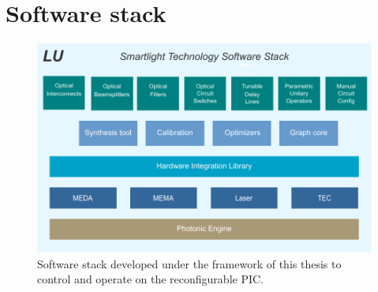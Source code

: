 
\section{Software stack}\label{sec:software_stack}

\begin{figure}[h]
	\begin{center}
		\includegraphics{figures/ch2-sw-stack.pdf}
	\end{center}
	\caption{Software stack developed under the framework of this thesis to control and operate on the reconfigurable PIC.}\label{fig:ch2-sw-stack}
\end{figure}

